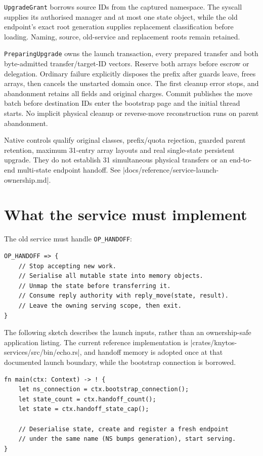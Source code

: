 \texttt{UpgradeGrant} borrows source IDs from the captured namespace. The
syscall supplies its authorised manager and at most one state object, while the old
endpoint's exact root generation supplies replacement classification before
loading. Naming, source, old-service and replacement roots remain retained.

\texttt{PreparingUpgrade} owns the launch transaction, every prepared transfer
and both byte-admitted transfer/target-ID vectors. Reserve both arrays before
escrow or delegation. Ordinary failure explicitly disposes the prefix after
guards leave, frees arrays, then cancels the unstarted domain once. The first
cleanup error stops, and abandonment retains all fields and original charges.
Commit publishes the move batch before destination IDs enter the bootstrap page
and the initial thread starts. No implicit physical cleanup or reverse-move
reconstruction runs on parent abandonment.

Native controls qualify original classes, prefix/quota rejection, guarded
parent retention, maximum 31-entry array layouts and real single-state persistent
upgrade. They do not establish 31 simultaneous physical transfers or an
end-to-end multi-state endpoint handoff. See
\repofile|docs/reference/service-launch-ownership.md|.

\section{What the service must implement}

The old service must handle \texttt{OP\_HANDOFF}:

\begin{lstlisting}[style=rustCode]
OP_HANDOFF => {
    // Stop accepting new work.
    // Serialise all mutable state into memory objects.
    // Unmap the state before transferring it.
    // Consume reply authority with reply_move(state, result).
    // Leave the owning serving scope, then exit.
}
\end{lstlisting}

The following sketch describes the launch inputs, rather than an ownership-safe
application listing. The current reference implementation is
\repofile|crates/knytos-services/src/bin/echo.rs|, and handoff memory is adopted once
at that documented launch boundary, while the bootstrap connection is borrowed.

\begin{lstlisting}[style=rustCode]
fn main(ctx: Context) -> ! {
    let ns_connection = ctx.bootstrap_connection();
    let state_count = ctx.handoff_count();
    let state = ctx.handoff_state_cap();

    // Deserialise state, create and register a fresh endpoint
    // under the same name (NS bumps generation), start serving.
}
\end{lstlisting}

